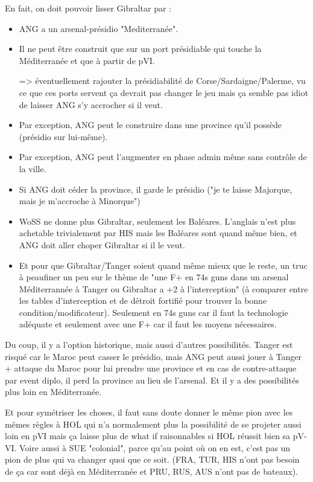 \begin{todo}
  En fait, on doit pouvoir lisser Gibraltar par :
  \begin{itemize}
  \item  ANG a un arsenal-présidio "Mediterranée".
  \item  Il ne peut être construit que sur un port présidiable qui
    touche la Méditerranée et que à partir de pVI.

    => éventuellement rajouter la présidiabilité de
    Corse/Sardaigne/Palerme, vu ce que ces ports servent ça devrait pas
    changer le jeu mais ça semble pas idiot de laisser ANG s'y accrocher
    si il veut.
  \item Par exception, ANG peut le construire dans une province qu'il
    possède (présidio sur lui-même).
  \item  Par exception, ANG peut l'augmenter en phase admin même sans
    contrôle de la ville.
  \item Si ANG doit céder la province, il garde le présidio ("je te
    laisse Majorque, mais je m'accroche à Minorque")
  \item WoSS ne donne plus Gibraltar, seulement les Baléares. L'anglais
    n'est plus achetable trivialement par HIS mais les Baléares sont
    quand même bien, et ANG doit aller choper Gibraltar si il le veut.
  \item Et pour que Gibraltar/Tanger soient quand même mieux que le
    reste, un truc à peaufiner un peu sur le thème de "une F+ en 74s
    guns dans un arsenal Méditerrannée à Tanger ou Gibraltar a +2 à
    l'interception" (à comparer entre les tables d'interception et de
    détroit fortifié pour trouver la bonne
    condition/modificateur). Seulement en 74s guns car il faut la
    technologie adéquate et seulement avec une F+ car il faut les
    moyens nécessaires.
  \end{itemize}

  Du coup, il y a l'option historique, mais aussi d'autres
  possibilités. Tanger est risqué car le Maroc peut casser le présidio,
  mais ANG peut aussi jouer à Tanger + attaque du Maroc pour lui prendre
  une province et en cas de contre-attaque par event diplo, il perd la
  province au lieu de l'arsenal. Et il y a des possibilités plus loin en
  Méditerranée.

  Et pour symétriser les choses, il faut sans doute donner le même pion
  avec les mêmes règles à HOL qui n'a normalement plus la possibilité de
  se projeter aussi loin en pVI mais ça laisse plus de what if
  raisonnables si HOL réussit bien sa pV-VI. Voire aussi à SUE
  "colonial", parce qu'au point où on en est, c'est pas un pion de plus
  qui va changer quoi que ce soit. (FRA, TUR, HIS n'ont pas besoin de ça
  car sont déjà en Méditerranée et PRU, RUS, AUS n'ont pas de bateaux).


\end{todo}
